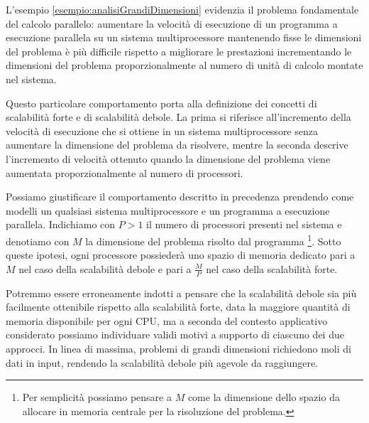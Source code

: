 L'esempio \ref{esempio:analisiGrandiDimensioni} evidenzia il problema fondamentale del calcolo parallelo: aumentare la velocit\`a di esecuzione 
di un programma a esecuzione parallela su un sistema multiprocessore mantenendo fisse le dimensioni del problema \`e pi\`u difficile rispetto a migliorare 
le prestazioni incrementando le dimensioni del problema proporzionalmente al numero di unit\`a di calcolo montate nel sistema.

Questo particolare comportamento porta alla definizione dei concetti di scalabilit\`a forte e di scalabilit\`a debole.\newline
La prima si riferisce all'incremento della velocit\`a di esecuzione che si ottiene in un sistema multiprocessore senza aumentare la dimensione del problema da 
risolvere, mentre la seconda descrive l'incremento di velocit\`a ottenuto quando la dimensione del problema viene aumentata proporzionalmente al numero 
di processori.

Possiamo giustificare il comportamento descritto in precedenza prendendo come modelli un qualsiasi sistema multiprocessore e un programma a esecuzione parallela.\newline 
Indichiamo con $P > 1$ il numero di processori presenti nel 
sistema e denotiamo con $M$ la dimensione del problema risolto dal programma \footnote{Per semplicit\`a possiamo pensare a $M$ come la dimensione dello spazio da allocare in memoria centrale per la 
risoluzione del problema.}.\newline
Sotto queste ipotesi, ogni processore possieder\`a uno spazio di memoria dedicato pari a $M$ nel caso della scalabilit\`a debole e pari a $\frac{M}{P}$ nel 
caso della scalabilit\`a forte.

Potremmo essere erroneamente indotti a pensare che la scalabilit\`a debole sia pi\`u facilmente ottenibile rispetto alla scalabilit\`a forte, data la maggiore quantit\`a di memoria disponibile per ogni CPU, ma a seconda 
del contesto applicativo considerato possiamo individuare validi motivi a supporto di ciascuno dei due approcci.\newline
In linea di massima, problemi di grandi 
dimensioni richiedono moli di dati in input, rendendo la scalabilit\`a debole pi\`u agevole da raggiungere.